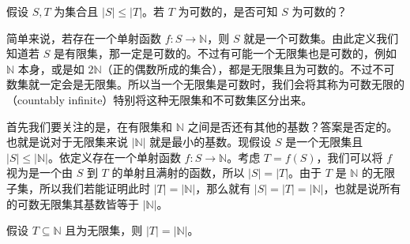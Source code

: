 \begin{question}
假设 $S, T$ 为集合且 $|S| \leq |T|$。若 $T$ 为可数的，是否可知 $S$ 为可数的？
\end{question}

简单来说，若存在一个单射函数 $f : S \to \mathbb{N}$，则 $S$ 就是一个可数集。由此定义我们知道若 $S$ 是有限集，那一定是可数的。不过有可能一个无限集也是可数的，例如 $\mathbb{N}$ 本身，或是如 $2\mathbb{N}$（正的偶数所成的集合），都是无限集且为可数的。不过不可数集就一定会是无限集。所以当一个无限集是可数时，我们会将其称为可数无限的（countably infinite）特别将这种无限集和不可数集区分出来。

首先我们要关注的是，在有限集和 $\mathbb{N}$ 之间是否还有其他的基数？答案是否定的。也就是说对于无限集来说 $|\mathbb{N}|$ 就是最小的基数。现假设 $S$ 是一个无限集且 $|S| \leq |\mathbb{N}|$。依定义存在一个单射函数 $f : S \to \mathbb{N}$。考虑 $T = f(S)$，我们可以将 $f$ 视为是一个由 $S$ 到 $T$ 的单射且满射的函数，所以 $|S| = |T|$。由于 $T$ 是 $\mathbb{N}$ 的无限子集，所以我们若能证明此时 $|T| = |\mathbb{N}|$，那么就有 $|S| = |T| = |\mathbb{N}|$，也就是说所有的可数无限集其基数皆等于 $|\mathbb{N}|$。

\begin{lemma}
假设 $T \subseteq \mathbb{N}$ 且为无限集，则 $|T| = |\mathbb{N}|$。
\end{lemma}

